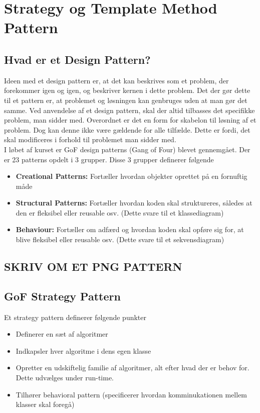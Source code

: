 \documentclass[../SWD_disp.tex]{subfiles}
\begin{document}
\section{Strategy og Template Method Pattern}

\subsection*{Hvad er et Design Pattern?}
Ideen med et design pattern er, at det kan beskrives som et problem, der forekommer igen og igen, og beskriver kernen i dette problem. Det der gør dette til et pattern er, at problemet og løsningen kan genbruges uden at man gør det samme. Ved anvendelse af et design pattern, skal der altid tilbasses det specifikke problem, man sidder med. Overordnet er det en form for skabelon til løsning af et problem. Dog kan denne ikke være gældende for alle tilfælde. Dette er fordi, det skal modificeres i forhold til problemet man sidder med.
\\

I løbet af kurset er GoF design patterns (Gang of Four) blevet gennemgået. Der er 23 patterns opdelt i 3 grupper. Disse 3 grupper definerer følgende

\begin{itemize}
	\item \textbf{Creational Patterns:} Fortæller hvordan objekter oprettet på en fornuftig måde
	\item \textbf{Structural Patterns:} Fortæller hvordan koden skal struktureres, således at den er fleksibel eller reusable osv. (Dette svare til et klassediagram)
	\item \textbf{Behaviour:} Fortæller om adfærd og hvordan koden skal opføre sig for, at blive fleksibel eller reusable osv. (Dette svare til et sekvensdiagram)
\end{itemize}
\subsection{SKRIV OM ET PNG PATTERN}
\subsection*{GoF Strategy Pattern}
Et strategy pattern definerer følgende punkter

\begin{itemize}
	\item Definerer en sæt af algoritmer
	\item Indkapsler hver algoritme i dens egen klasse
	\item Opretter en udskiftelig familie af algoritmer, alt efter hvad der er behov for. Dette udvælges under run-time.
	\item Tilhører behavioral pattern (specificerer hvordan komminukationen mellem klasser skal foregå)
\end{itemize}
\end{document}
